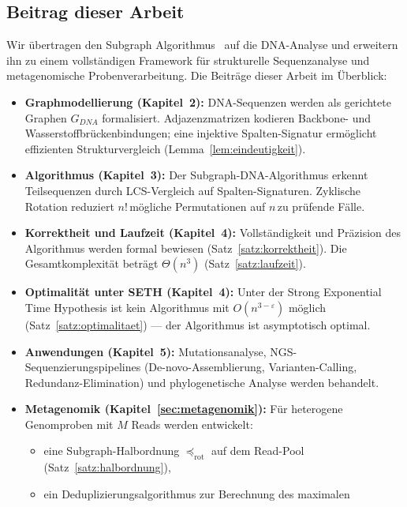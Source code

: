 ﻿\documentclass[a4paper,12pt]{article}
\theoremstyle{definition}
\begin{document}
\subsection{Beitrag dieser Arbeit}

Wir \"{u}bertragen den Subgraph Algorithmus~\cite{epp2026} auf die DNA-Analyse und
erweitern ihn zu einem vollst\"{a}ndigen Framework f\"{u}r strukturelle Sequenzanalyse
und metagenomische Probenverarbeitung. Die Beitr\"{a}ge dieser Arbeit im \"{U}berblick:

\begin{itemize}
    \item \textbf{Graphmodellierung (Kapitel~2):} DNA-Sequenzen werden als
          gerichtete Graphen $G_{DNA}$ formalisiert. Adjazenzmatrizen kodieren
          Backbone- und Wasserstoffbr\"{u}ckenbindungen; eine injektive
          Spalten-Signatur erm\"{o}glicht effizienten Strukturvergleich
          (Lemma~\ref{lem:eindeutigkeit}).
    \item \textbf{Algorithmus (Kapitel~3):} Der Subgraph-DNA-Algorithmus erkennt
          Teilsequenzen durch LCS-Vergleich auf Spalten-Signaturen. Zyklische
          Rotation reduziert $n!$\,m\"{o}gliche Permutationen auf $n$\,zu
          pr\"{u}fende F\"{a}lle.
    \item \textbf{Korrektheit und Laufzeit (Kapitel~4):} Vollst\"{a}ndigkeit
          und Pr\"{a}zision des Algorithmus werden formal bewiesen
          (Satz~\ref{satz:korrektheit}). Die Gesamtkomplexit\"{a}t betr\"{a}gt
          $\Theta(n^3)$ (Satz~\ref{satz:laufzeit}).
    \item \textbf{Optimalit\"{a}t unter SETH (Kapitel~4):} Unter der Strong
          Exponential Time Hypothesis ist kein Algorithmus mit
          $O(n^{3-\varepsilon})$ m\"{o}glich (Satz~\ref{satz:optimalitaet}) ---
          der Algorithmus ist asymptotisch optimal.
    \item \textbf{Anwendungen (Kapitel~5):} Mutationsanalyse,
          NGS-Sequenzierungspipelines (De-novo-Assemblierung, Varianten-Calling,
          Redundanz-Elimination) und phylogenetische Analyse werden behandelt.
    \item \textbf{Metagenomik (Kapitel~\ref{sec:metagenomik}):} F\"{u}r
          heterogene Genomproben mit $M$ Reads werden entwickelt:
          \begin{itemize}
              \item eine Subgraph-Halbordnung $\preceq_{\mathrm{rot}}$ auf dem
                    Read-Pool (Satz~\ref{satz:halbordnung}),
              \item ein Deduplizierungsalgorithmus zur Berechnung des maximalen

\end{itemize}
\end{itemize}
\end{document}

